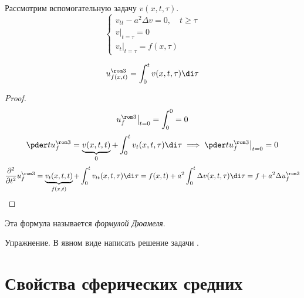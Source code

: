 Рассмотрим вспомогательную задачу $ v(x, t, \tau) $.
$$
\begin{cases}
	v_{tt} - a^2 \Delta v = 0, \quad t \ge \tau \\
	v\bigr|_{t = \tau} = 0 \\
	v_t\bigr|_{t = \tau} = f(x, \tau)
\end{cases} $$

\begin{statement}
	$$ u_{f(x, t)}^{\rom3} = \int_0^t v(x, t, \tau) \di \tau $$
\end{statement}

\begin{proof}
	$$ u_f^{\rom3}\bigr|_{t = 0} = \int_0^0 = 0 $$
	$$ \pder t u_f^{\rom3} = \underbrace{v(x, t, t)}_{0} + \int_0^t v_t(x, t, \tau) \di \tau \implies
	\pder t u_f^{\rom3}\bigr|_{t = 0} = 0 $$
	$$ \frac{\partial^2}{\partial t^2} u_f^{\rom3} = \underbrace{v_t(x, t, t)}_{f(x, t)} +
	\int_0^t v_{tt} (x, t, \tau) \di \tau = f(x, t) + a^2 \int_0^t \Delta v(x, t, \tau) \di \tau =
	f + a^2 \Delta u_f^{\rom3} $$
\end{proof}

Эта формула называется \emph{формулой Дюамеля}.

\begin{undefthm}{Упражнение.}
	В явном виде написать решение задачи .
\end{undefthm}

\section{Свойства сферических средних}
